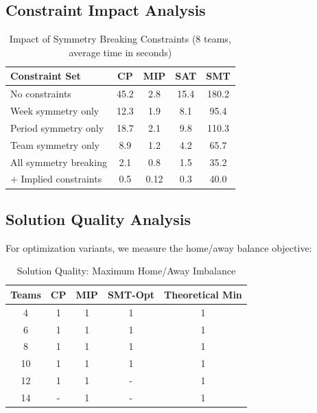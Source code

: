 \documentclass[11pt]{article}
\begin{document}
\subsection{Constraint Impact Analysis}

\begin{table}[H]
\centering
\caption{Impact of Symmetry Breaking Constraints (8 teams, average time in seconds)}
\label{tab:constraints}
\begin{tabular}{@{}lcccc@{}}
\toprule
\textbf{Constraint Set} & \textbf{CP} & \textbf{MIP} & \textbf{SAT} & \textbf{SMT} \\
\midrule
No constraints          & 45.2 & 2.8  & 15.4 & 180.2 \\
Week symmetry only      & 12.3 & 1.9  & 8.1  & 95.4  \\
Period symmetry only    & 18.7 & 2.1  & 9.8  & 110.3 \\
Team symmetry only      & 8.9  & 1.2  & 4.2  & 65.7  \\
All symmetry breaking   & 2.1  & 0.8  & 1.5  & 35.2  \\
+ Implied constraints   & 0.5  & 0.12 & 0.3  & 40.0  \\
\bottomrule
\end{tabular}
\end{table}

\subsection{Solution Quality Analysis}

For optimization variants, we measure the home/away balance objective:

\begin{table}[H]
\centering
\caption{Solution Quality: Maximum Home/Away Imbalance}
\label{tab:quality}
\begin{tabular}{@{}ccccc@{}}
\toprule
\textbf{Teams} & \textbf{CP} & \textbf{MIP} & \textbf{SMT-Opt} & \textbf{Theoretical Min} \\
\midrule
4  & 1 & 1 & 1 & 1 \\
6  & 1 & 1 & 1 & 1 \\
8  & 1 & 1 & 1 & 1 \\
10 & 1 & 1 & 1 & 1 \\
12 & 1 & 1 & - & 1 \\
14 & - & 1 & - & 1 \\
\bottomrule
\end{tabular}
\end{table}
\end{document}
